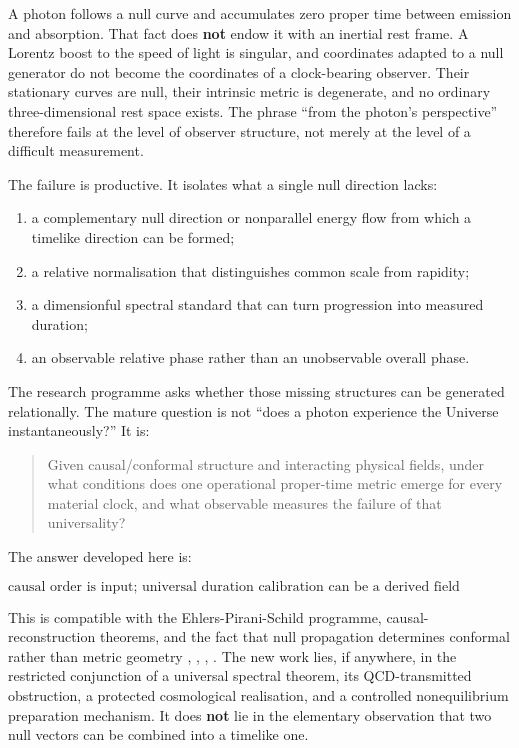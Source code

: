 \documentclass[
]{article}
\providecommand{\tightlist}{%
  \setlength{\itemsep}{0pt}\setlength{\parskip}{0pt}}
\begin{document}
A photon follows a null curve and accumulates zero proper time between
emission and absorption. That fact does \textbf{not} endow it with an
inertial rest frame. A Lorentz boost to the speed of light is singular,
and coordinates adapted to a null generator do not become the
coordinates of a clock-bearing observer. Their stationary curves are
null, their intrinsic metric is degenerate, and no ordinary
three-dimensional rest space exists. The phrase ``from the photon's
perspective'' therefore fails at the level of observer structure, not
merely at the level of a difficult measurement.

The failure is productive. It isolates what a single null direction
lacks:

\begin{enumerate}
\def\labelenumi{\arabic{enumi}.}
\tightlist
\item
  a complementary null direction or nonparallel energy flow from which a
  timelike direction can be formed;
\item
  a relative normalisation that distinguishes common scale from
  rapidity;
\item
  a dimensionful spectral standard that can turn progression into
  measured duration;
\item
  an observable relative phase rather than an unobservable overall
  phase.
\end{enumerate}

The research programme asks whether those missing structures can be
generated relationally. The mature question is not ``does a photon
experience the Universe instantaneously?'' It is:

\begin{quote}
Given causal/conformal structure and interacting physical fields, under
what conditions does one operational proper-time metric emerge for every
material clock, and what observable measures the failure of that
universality?
\end{quote}

The answer developed here is:

\[
\boxed{
\text{causal order is input; universal duration calibration can be a derived field relation.}
}
\]

This is compatible with the Ehlers-Pirani-Schild programme,
causal-reconstruction theorems, and the fact that null propagation
determines conformal rather than metric geometry
, ,
, .
The new work lies, if anywhere, in the restricted conjunction of a
universal spectral theorem, its QCD-transmitted obstruction, a protected
cosmological realisation, and a controlled nonequilibrium preparation
mechanism. It does \textbf{not} lie in the elementary observation that
two null vectors can be combined into a timelike one.
\end{document}
